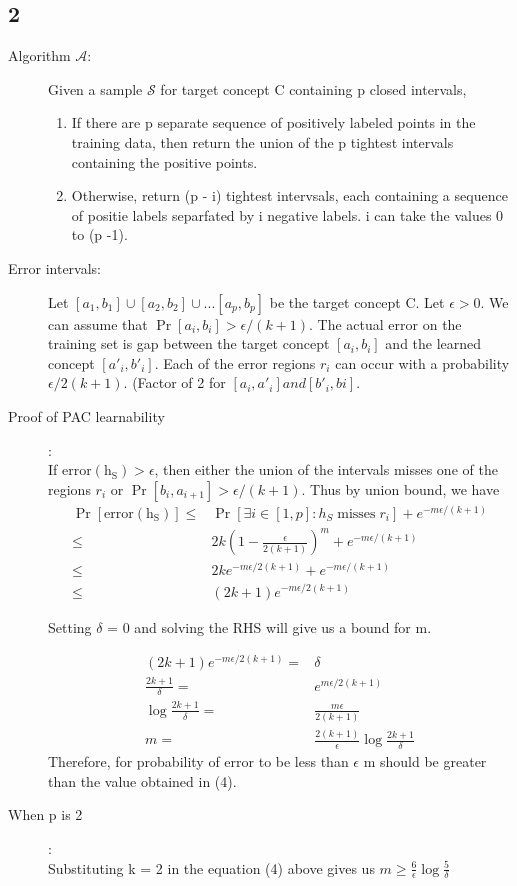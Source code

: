 \documentclass{article}
\begin{document}
\subsection*{2}
\begin{description}
  \item[Algorithm \( \mathcal{A} \):]  Given a sample \( \mathcal{S}\) for target concept C containing p closed intervals,
    \begin{enumerate}
      \item If there are p separate sequence of positively labeled points in the training data, then return the union of the p tightest intervals containing the positive points.
      \item Otherwise, return (p - i) tightest intervsals, each containing a sequence of positie labels separfated by i negative labels.  i can take the values 0 to (p -1).
    \end{enumerate}
  \item[Error intervals:] Let \( [a_{1}, b_{1}] \cup [a_{2}, b_{2}] \cup ... [a_{p}, b_{p}] \) be the target concept C.  Let \( \epsilon > 0\). We can assume that \(\Pr[a_{i}, b_{i}] > \epsilon/(k + 1) \).  The actual error on the training set is gap between the target concept \( [a_{i}, b_{i}]\) and the learned concept \( [a'_{i}, b'_{i}] \).  Each of the error regions \( r_{i}\) can occur with a probability \( \epsilon/2(k + 1) \). (Factor of 2 for \( [a_{i}, a'_{i}] and [b'_{i}, b{i}] \).
  \item[Proof of PAC learnability]:\\
    If \( \mathrm{error(h_{S})} > \epsilon\), then either the union of the intervals misses one of the regions \( r_{i} \) or \( \Pr[b_{i}, a_{i+1}] > \epsilon/(k+1)\).  Thus by union bound, we have
    \begin{align*}
      \Pr[\mathrm{error(h_{S})}] \le & \Pr[\exists{i} \in [1, p]: h_{S} \; \mathrm{misses} \; r_{i}] + e^{-m\epsilon/(k+1)}\\
      \le & 2k(1-\frac{\epsilon}{2(k+1)})^{m} + e^{-m\epsilon/(k+1)}\\
      \le & 2ke^{-m\epsilon/{2(k+1)}} + e^{-m\epsilon/(k+1)}\\
      \le & (2k+1)e^{-m\epsilon/2(k+1)}
    \end{align*}

    Setting \( \delta \) = 0 and solving the RHS will give us a bound for m.

    \begin{align}
      (2k+1)e^{-m\epsilon/2(k+1)} = & \delta\\
      \frac{2k+1}{\delta} = & e^{m\epsilon/2(k+1)}\\
      \log{\frac{2k+1}{\delta}} = & \frac{m\epsilon}{2(k+1)}\\
      m = & \frac{2(k+1)}{\epsilon} \log{\frac{2k+1}{\delta}}
    \end{align}
    Therefore, for probability of error to be less than \(\epsilon\) m should be greater than the value obtained in (4).
  \item[When p is 2]:\\
    Substituting k = 2 in the equation (4) above gives us \(m \ge \frac{6}{\epsilon} \log{\frac{5}{\delta}}\)

\end{description}
\end{document}
